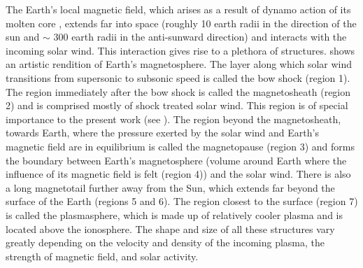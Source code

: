         The Earth's local magnetic field, which arises as a result of dynamo action of its molten
        core \citep{Elsasser1956}, extends far into space (roughly 10 earth radii in the direction
        of the sun and $\sim$ 300 earth radii in the anti-sunward direction) and interacts with the
        incoming solar wind. This interaction gives rise to a plethora of structures.
         shows an artistic rendition of Earth's magnetosphere. The layer along
        which solar wind transitions from supersonic to subsonic speed is called the bow shock
        (region 1). The region immediately after the bow shock is called the magnetosheath (region
        2) and is comprised mostly of shock treated solar wind. This region is of special importance
        to the present work (see ). The region beyond the magnetosheath,
        towards Earth, where the pressure exerted by the solar wind and Earth's magnetic field are
        in equilibrium is called the magnetopause (region 3) and forms the boundary between Earth's
        magnetosphere (volume  around  Earth  where the influence  of  its magnetic field is felt
        (region 4)) and the solar wind. There is also a long magnetotail further away from the Sun,
        which extends far beyond the surface of the Earth (regions 5 and 6). The region closest to
        the surface (region 7) is called the plasmasphere, which is made up of relatively cooler
        plasma and is located above the ionosphere. The shape and size of all these structures vary
        greatly depending on the velocity and density of the incoming plasma, the strength of
        magnetic field, and solar activity.


